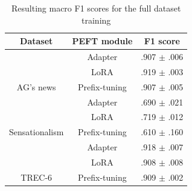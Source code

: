 \begin{table}[htbp]
\centering

\begin{tabular}{c|c|c}
\toprule
\textbf{Dataset} & \textbf{PEFT module} & \textbf{F1 score}\\
\midrule
 & Adapter & .907 $\pm$ {\small .006}\\

 & LoRA & .919 $\pm$ {\small .003}\\

\multirow{-3}{*}{\centering\arraybackslash AG's news} & Prefix-tuning & .907 $\pm$ {\small .005}\\
\hline
 & Adapter & .690 $\pm$ {\small .021}\\

 & LoRA & .719 $\pm$ {\small .012}\\

\multirow{-3}{*}{\centering\arraybackslash Sensationalism} & Prefix-tuning & .610 $\pm$ {\small .160}\\
\hline
 & Adapter & .918 $\pm$ {\small .007}\\

 & LoRA & .908 $\pm$ {\small .008}\\

\multirow{-3}{*}{\centering\arraybackslash TREC-6} & Prefix-tuning & .909 $\pm$ {\small .002}\\
\bottomrule
\end{tabular}
\caption{Resulting macro F1 scores for the full dataset training}
\label{tab:baselines_full}
\end{table}

